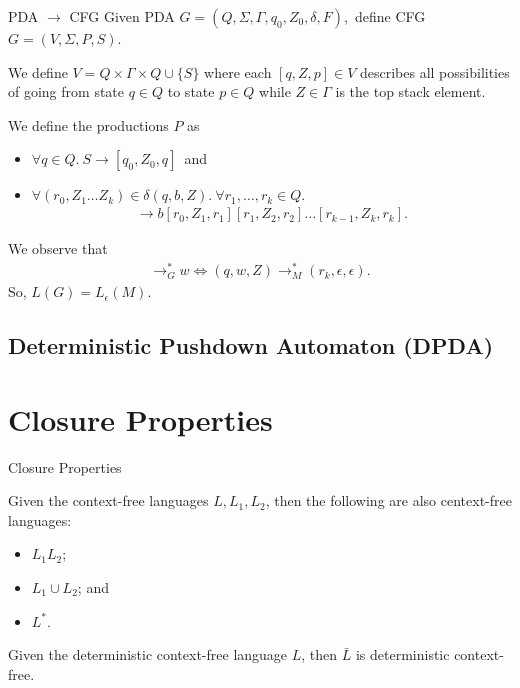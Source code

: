 \documentclass{beamer}
\def\padding{\vspace{0.5cm}}
\def\spadding{\vspace{0.25cm}}
\begin{document}
\begin{frame}{PDA $\to$ CFG}
    Given PDA $G = (Q,\Sigma,\Gamma,q_0,Z_0,\delta,F)$,\pause\ define CFG $G = (V,\Sigma,P,S)$.\pause\par\spadding
    We define $V = Q \times \Gamma \times Q \cup \{S\}$ where each $[q,Z,p] \in V$ describes all possibilities of going from state $q \in Q$ to state $p \in Q$ while $Z \in \Gamma$ is the top stack element.\pause\par\spadding
    We define the productions $P$ as \begin{itemize}
        \item $\forall q \in Q.\ S \to [q_0,Z_0,q]$\pause\ and
        \item $\forall (r_0, Z_1 \dots Z_k) \in \delta(q,b,Z).\ \forall r_1, \dots, r_k \in Q.$\pause \begin{align*}
            [q,Z,r_k] \to b [r_0,Z_1,r_1][r_1,Z_2,r_2]\dots[r_{k-1},Z_k,r_k].
        \end{align*}
    \end{itemize}\pause\padding
    We observe that \begin{align*}
        [q,Z,r_k] \to_G^* w \iff (q,w,Z) \to_M^* (r_k,\epsilon,\epsilon).
    \end{align*}\pause
    So, $L(G) = L_{\epsilon}(M)$.
\end{frame}

\subsection{Deterministic Pushdown Automaton (DPDA)}

\section{Closure Properties}

\begin{frame}{Closure Properties}
    \begin{theorem}
        Given the context-free languages $L, L_1, L_2$, then the following are also centext-free languages:\pause
        \begin{itemize}
            \item $L_1 L_2$\pause;
            \item $L_1 \cup L_2$\pause; and
            \item $L^*$.
        \end{itemize}
    \end{theorem}\pause

    \begin{theorem}
        Given the deterministic context-free language $L$, then $\bar{L}$ is deterministic context-free.
    \end{theorem}
\end{frame}
\end{document}
